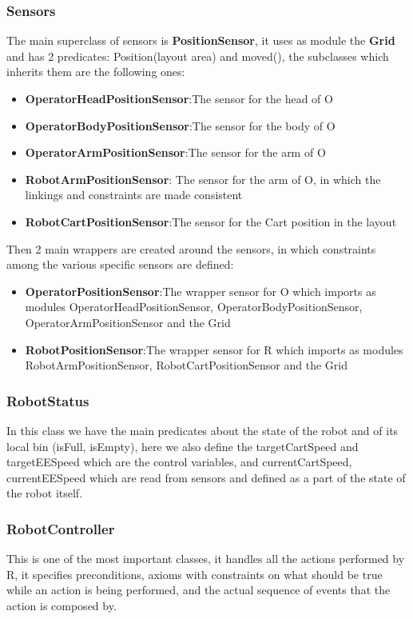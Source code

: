 \documentclass[a4paper]{article}
\begin{document}
\subsubsection{Sensors}
The main superclass of sensors is \textbf{PositionSensor}, it uses as module the \textbf{Grid} and has 2 predicates: Position(layout area) and moved(), the subclasses which inherits them are the following ones:

\begin{itemize}
    \item \textbf{OperatorHeadPositionSensor}:\@ The sensor for the head of O
    \item \textbf{OperatorBodyPositionSensor}:\@ The sensor for the body of O
    \item \textbf{OperatorArmPositionSensor}:\@ The sensor for the arm of O
    \item \textbf{RobotArmPositionSensor}:\@
The sensor for the arm of O, in which the linkings and constraints are made consistent
    \item \textbf{RobotCartPositionSensor}:\@ The sensor for the Cart position in the layout
\end{itemize}

Then 2 main wrappers are created around the sensors, in which constraints among the various specific sensors are defined:
\begin{itemize}
    \item \textbf{OperatorPositionSensor}:\@ The wrapper sensor for O which imports as modules OperatorHeadPositionSensor, OperatorBodyPositionSensor, OperatorArmPositionSensor and the Grid
    \item \textbf{RobotPositionSensor}:\@ The wrapper sensor for R which imports as modules RobotArmPositionSensor, RobotCartPositionSensor and the Grid

\end{itemize}

\subsubsection{RobotStatus}
In this class we have the main predicates about the state of the robot and of its local bin (isFull, isEmpty), here we also define the targetCartSpeed and targetEESpeed which are the control variables, and currentCartSpeed, currentEESpeed which are read from sensors and defined as a part of the state of the robot itself.

\subsubsection{RobotController}
This is one of the most important classes, it handles all the actions performed by R, it specifies preconditions, axioms with constraints on what should be true while an action is being performed, and the actual sequence of events that the action is composed by.
\end{document}
